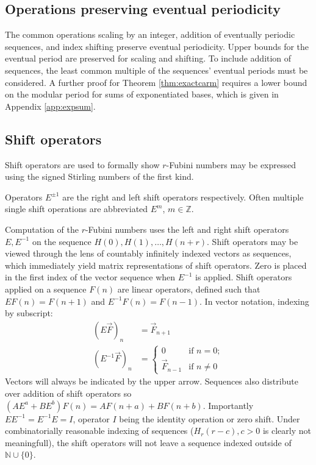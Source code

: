 \documentclass[12pt,reqno]{article}
\begin{document}
\subsection{Operations preserving eventual periodicity}\label{subsec:evperioprop}
The common operations scaling by an integer, addition of eventually periodic sequences, and index shifting preserve eventual periodicity. Upper bounds for the eventual period are preserved for scaling and shifting. To include addition of sequences, the least common multiple of the sequences' eventual periods must be considered. A further proof for Theorem \ref{thm:exactcarm} requires a lower bound on the modular period for sums of exponentiated bases, which is given in Appendix \ref{app:expsum}. 

\subsection{Shift operators}

Shift operators are used to formally show $r$-Fubini numbers may be expressed using the signed Stirling numbers of the first kind.

\begin{definition}
	Operators $E^{\pm 1}$ are the right and left shift operators respectively. Often multiple single shift operations are abbreviated $E^{m}$, $m \in \mathbb{Z}$.
\end{definition}

Computation of the $r$-Fubini numbers uses the left and right shift operators $E, E^{-1}$ on the sequence $H(0), H(1), \ldots, H(n + r)$. Shift operators may be viewed through the lens of countably infinitely indexed vectors as sequences, which immediately yield matrix representations of shift operators. Zero is placed in the first index of the vector sequence when $E^{-1}$ is applied.
Shift operators applied on a sequence $F(n)$ are linear operators, defined such that $E F(n) = F(n + 1)$ and $E^{-1}F(n) = F(n - 1)$. In vector notation, indexing by subscript:
\begin{align}
	 (E\vec{F})_{n} &= \vec{F}_{n + 1}\\
 (E^{-1}\vec{F})_{n} &= \begin{cases}
 	0  & \text{if } n = 0 ;\\
 	\vec{F}_{n - 1}  & \text{if } n \neq 0
 \end{cases}
\end{align}
Vectors will always be indicated by the upper arrow. Sequences also distribute over addition of shift operators so $(AE^{a} + BE^{b})F(n) = AF(n + a) + BF(n+b)$. Importantly $EE^{-1} = E^{-1}E = I$, operator $I$ being the identity operation or zero shift. Under combinatorially reasonable indexing of sequences ($H_{r}(r - c), c > 0$ is clearly not meaningfull), the shift operators will not leave a sequence indexed outside of $\mathbb{N} \cup \{0\}$.
\end{document}
